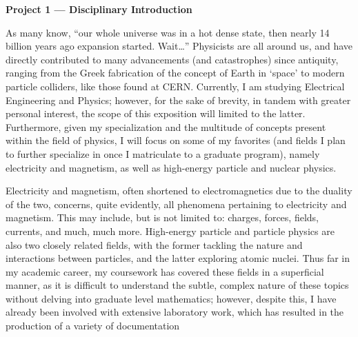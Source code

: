 



\begin{center}

  \textbf{Project 1 — Disciplinary Introduction}

\end{center}

\begin{justify}

  \hspace{.5in} As many know, ``our whole universe was in a hot dense state, then nearly 14 billion years ago expansion started. Wait\ldots'' Physicists are all around us, and have directly contributed to many advancements (and catastrophes) since antiquity, ranging from the Greek fabrication of the concept of Earth in `space' to modern particle colliders, like those found at CERN. Currently, I am studying Electrical Engineering and Physics; however, for the sake of brevity, in tandem with greater personal interest, the scope of this exposition will limited to the latter. Furthermore, given my specialization and the multitude of concepts present within the field of physics, I will focus on some of my favorites (and fields I plan to further specialize in once I matriculate to a graduate program), namely electricity and magnetism, as well as high-energy particle and nuclear physics.

  \hspace{.5in} Electricity and magnetism, often shortened to electromagnetics due to the duality of the two, concerns, quite evidently, all phenomena pertaining to electricity and magnetism. This may include, but is not limited to: charges, forces, fields, currents, and much, much more. High-energy particle and particle physics are also two closely related fields, with the former tackling the nature and interactions between particles, and the latter exploring atomic nuclei. Thus far in my academic career, my coursework has covered these fields in a superficial manner, as it is difficult to understand the subtle, complex nature of these topics without delving into graduate level mathematics; however, despite this, I have already been involved with extensive laboratory work, which has resulted in the production of a variety of documentation


\end{justify}
